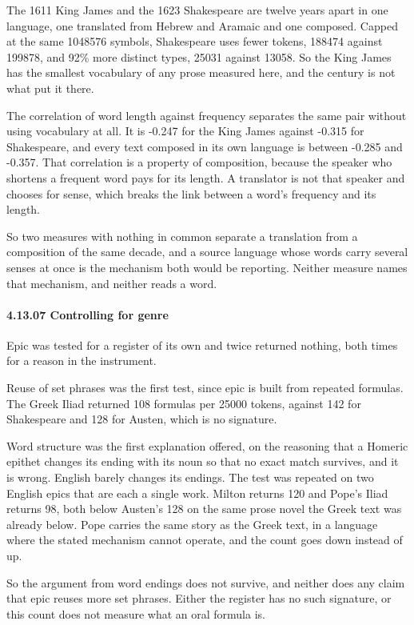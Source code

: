 The 1611 King James and the 1623 Shakespeare are twelve years apart in one language, one translated from Hebrew and Aramaic and one composed. Capped at the same 1048576 symbols, Shakespeare uses fewer tokens, 188474 against 199878, and 92\% more distinct types, 25031 against 13058. So the King James has the smallest vocabulary of any prose measured here, and the century is not what put it there.

The correlation of word length against frequency separates the same pair without using vocabulary at all. It is -0.247 for the King James against -0.315 for Shakespeare, and every text composed in its own language is between -0.285 and -0.357. That correlation is a property of composition, because the speaker who shortens a frequent word pays for its length. A translator is not that speaker and chooses for sense, which breaks the link between a word's frequency and its length.

So two measures with nothing in common separate a translation from a composition of the same decade, and a source language whose words carry several senses at once is the mechanism both would be reporting. Neither measure names that mechanism, and neither reads a word.

\paragraph{4.13.07 Controlling for genre}

Epic was tested for a register of its own and twice returned nothing, both times for a reason in the instrument.

Reuse of set phrases was the first test, since epic is built from repeated formulas. The Greek Iliad returned 108 formulas per 25000 tokens, against 142 for Shakespeare and 128 for Austen, which is no signature.

Word structure was the first explanation offered, on the reasoning that a Homeric epithet changes its ending with its noun so that no exact match survives, and it is wrong. English barely changes its endings. The test was repeated on two English epics that are each a single work. Milton returns 120 and Pope's Iliad returns 98, both below Austen's 128 on the same prose novel the Greek text was already below. Pope carries the same story as the Greek text, in a language where the stated mechanism cannot operate, and the count goes down instead of up.

So the argument from word endings does not survive, and neither does any claim that epic reuses more set phrases. Either the register has no such signature, or this count does not measure what an oral formula is.


